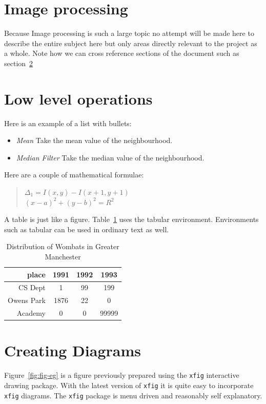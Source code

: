 \section{Image processing}
Because Image processing is such a large topic no attempt will be made
here to describe the entire subject here but only areas directly
relevant to the project as a whole. Note how we can cross reference
sections of the document such as section~\ref{pg:filters}

\section{Low level operations}\label{pg:filters}
Here is an example of a list with bullets:
\begin{itemize}
\item{\it Mean} Take the mean value of the neighbourhood.

\item{\it Median Filter} Take the median value of the neighbourhood.
\end{itemize}

Here are a couple of mathematical formulae:
\begin{quote}
\centering
$\Delta_1=I(x,y)-I(x+1,y+1)$ \\
${(x-a)}^2+{(y-b)}^2=R^2$
\end{quote}

A table is just like a figure. Table~\ref{wombat} uses the tabular
environment.  Environments such as tabular can be used in ordinary
text as well.
\begin{table}
\begin{center}
\begin{tabular}{|r|c|c|c|}\hline\hline
place&1991&1992&1993\\\hline
CS Dept& 1&99&199\\
Owens Park& 1876& 22&0\\
Academy&0&0&99999\\\hline\hline
\end{tabular}
\end{center}
\caption{Distribution of Wombats in Greater Manchester}\label{wombat}
\end{table}


\section{Creating Diagrams}
\label{sec:diagrams}

Figure~\ref{fig:fig-eg} is a figure previously prepared using the
\texttt{xfig} interactive drawing package. With the latest version of
\texttt{xfig} it is quite easy to incorporate \texttt{xfig} diagrams.
The \texttt{xfig} package is menu driven and reasonably self
explanatory.

